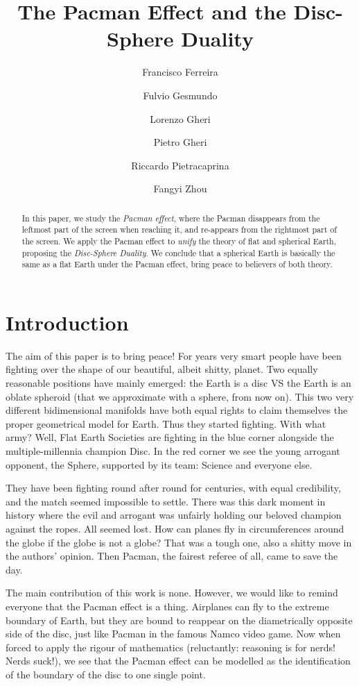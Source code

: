 \documentclass{article}
\title{The Pacman Effect and the Disc-Sphere Duality}
\author{Francisco Ferreira
\and Fulvio Gesmundo \and Lorenzo Gheri \and Pietro Gheri \and  Riccardo Pietracaprina \and Fangyi Zhou }
\date{}
\begin{document}
\maketitle
\begin{abstract}
  In this paper, we study the \emph{Pacman effect}, where the Pacman disappears
  from the leftmost part of the screen when reaching it, and re-appears from
  the rightmost part of the screen.
  We apply the Pacman effect to \emph{unify} the theory of flat and spherical
  Earth, proposing the \emph{Disc-Sphere Duality}.
  We conclude that a spherical Earth is basically the same as a flat Earth
  under the Pacman effect, bring peace to believers of both theory.
\end{abstract}

\section{Introduction}

The aim of this paper is to bring peace! For years very smart people have been
fighting over the shape of our beautiful, albeit shitty, planet. Two equally
reasonable positions have mainly emerged: the Earth is a disc VS the Earth is
an oblate spheroid (that we approximate with a sphere, from now on).
This two very different bidimensional manifolds have both equal rights
to claim themselves the proper geometrical model for Earth. Thus they started
fighting. With what army? Well, Flat Earth Societies are fighting in the blue
corner alongside the multiple-millennia champion Disc. In the red corner we see
the young arrogant opponent, the Sphere, supported by its team: Science and
everyone else.

They have been fighting round after round for centuries, with equal
credibility, and the match seemed impossible to settle. There was this dark
moment in history where the evil and arrogant was unfairly holding our beloved
champion against the ropes. All seemed lost. How can planes fly in
circumferences around the globe if the globe is not a globe? That was a tough
one, also a shitty move in the authors' opinion. Then Pacman, the fairest
referee of all, came to save the day.

The main contribution of this work is none. However, we would like to remind
everyone that the Pacman effect is a thing. Airplanes can fly to the extreme
boundary of Earth, but they are bound to reappear on the diametrically opposite
side of the disc, just like Pacman in the famous Namco video game. Now when
forced to apply the rigour of mathematics (reluctantly: reasoning is for nerds!
Nerds suck!), we see that the Pacman effect can be modelled as the
identification of the boundary of the disc to one single point.
\end{document}
